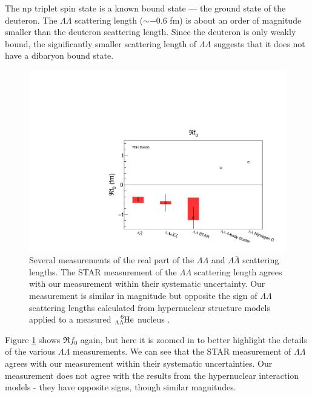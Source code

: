 The np triplet spin state is a known bound state --- the ground state of the deuteron.
 The $\Lambda\Lambda$ scattering length ($\sim-0.6$ fm) is about an order of magnitude smaller than the deuteron scattering length.
Since the deuteron is only weakly bound, the significantly smaller scattering length of $\Lambda\Lambda$ suggests that it does not have a dibaryon bound state.

\begin{figure}[hbtp]
\includegraphics[width=36pc]{Figures/FitResults/2016-10-12-Ref0Zoom.pdf}
\caption[Measurements of $\Re f_0$ for various particle pairs (zoomed)]{Several measurements of the real part of the $\Lambda\Lambda$ and $\Lambda\bar{\Lambda}$ scattering lengths. The STAR measurement \cite{Adamczyk:2014vca} of the $\Lambda\Lambda$ scattering length agrees with our measurement within their systematic uncertainty. Our measurement is similar in magnitude but opposite the sign of $\Lambda\Lambda$ scattering lengths calculated from hypernuclear structure models \cite{ Hiyama:2002yj, Filikhin:2002wm} applied to a measured $\ce{^{6}_{\Lambda\Lambda}\mathrm{He}}$ nucleus \cite{Takahashi:2001nm}.}
\label{fig:Ref0Zoom}
\end{figure}

Figure \ref{fig:Ref0Zoom} shows $\Re f_0$ again, but here it is zoomed in to better highlight the details of the various $\Lambda\Lambda$ measurements.
We can see that the STAR measurement of $\Lambda\Lambda$ agrees with our measurement within their systematic uncertainties.
Our measurement does not agree with the results from the hypernuclear interaction models - they have opposite signs, though similar magnitudes. 



